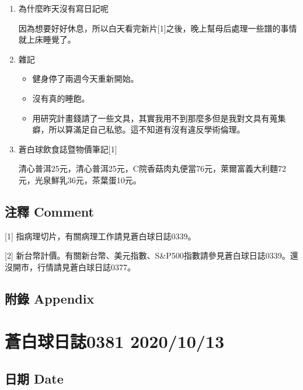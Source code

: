 \documentclass[
]{article}
\providecommand{\tightlist}{%
  \setlength{\itemsep}{0pt}\setlength{\parskip}{0pt}}
\begin{document}
\begin{enumerate}
\def\labelenumi{\arabic{enumi}.}
\item
  為什麼昨天沒有寫日記呢

  因為想要好好休息，所以白天看完新片{[}1{]}之後，晚上幫母后處理一些譜的事情就上床睡覺了。
\item
  雜記

  \begin{itemize}
  \tightlist
  \item
    健身停了兩週今天重新開始。
  \item
    沒有真的睡飽。
  \item
    用研究計畫錢請了一些文具，其實我用不到那麼多但是我對文具有蒐集癖，所以算滿足自己私慾。這不知道有沒有違反學術倫理。
  \end{itemize}
\item
  蒼白球飲食誌暨物價筆記{[}1{]}

  清心普洱25元，清心普洱25元，C院香菇肉丸便當76元，萊爾富義大利麵72元，光泉鮮乳36元，茶葉蛋10元。
\end{enumerate}

\hypertarget{ux6ce8ux91cb-comment-38}{%
\subsection{注釋 Comment}\label{ux6ce8ux91cb-comment-38}}

{[}1{]} 指病理切片，有關病理工作請見蒼白球日誌0339。

{[}2{]}
新台幣計價。有關新台幣、美元指數、S\&P500指數請參見蒼白球日誌0339。還沒開市，行情請見蒼白球日誌0377。

\hypertarget{ux9644ux9304-appendix-38}{%
\subsection{附錄 Appendix}\label{ux9644ux9304-appendix-38}}

\hypertarget{ux84bcux767dux7403ux65e5ux8a8c0381-20201013}{%
\section{蒼白球日誌0381
2020/10/13}\label{ux84bcux767dux7403ux65e5ux8a8c0381-20201013}}

\hypertarget{ux65e5ux671f-date-39}{%
\subsection{日期 Date}\label{ux65e5ux671f-date-39}}
\end{document}
